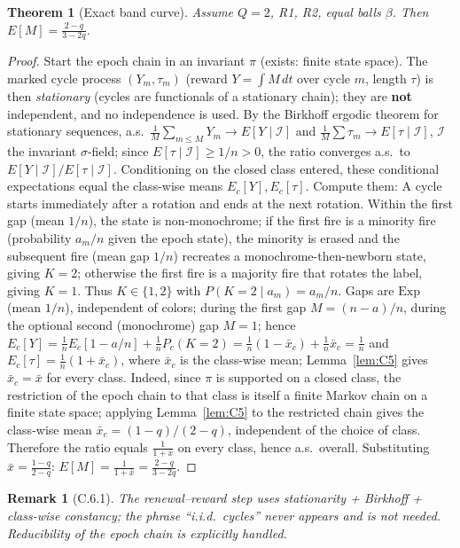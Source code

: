 \documentclass[preprint,12pt]{elsarticle}
\newtheorem{theorem}{Theorem}[section]
\newtheorem{remark}{Remark}[theorem]
\begin{document}
\begin{theorem}[Exact band curve]
\label{thm:C6}
Assume $Q=2$, R1, R2, equal balls $\beta$. Then
$E[M]=\frac{2-q}{3-2q}$.
\end{theorem}
\begin{proof}
Start the epoch chain in an invariant $\pi$ (exists: finite state space).
The marked cycle process $(Y_m,\tau_m)$ (reward $Y=\int M\,dt$ over cycle
$m$, length $\tau$) is then \emph{stationary} (cycles are functionals of
a stationary chain); they are \textbf{not} independent, and no
independence is used. By the Birkhoff ergodic theorem for stationary
sequences, a.s.\ $\frac1M\sum_{m\le M}Y_m\to E[Y\mid\mathcal I]$ and
$\frac1M\sum\tau_m\to E[\tau\mid\mathcal I]$, $\mathcal I$ the invariant
$\sigma$-field; since $E[\tau\mid\mathcal I]\ge1/n>0$, the ratio
converges a.s.\ to $E[Y\mid\mathcal I]/E[\tau\mid\mathcal I]$.
Conditioning on the closed class entered, these conditional expectations
equal the class-wise means $E_c[Y],E_c[\tau]$. Compute them: A cycle starts immediately after a rotation and ends at the next
rotation. Within the first gap (mean $1/n$), the state is non-monochrome;
if the first fire is a minority fire (probability $a_m/n$ given the
epoch state), the minority is erased and the subsequent fire (mean gap
$1/n$) recreates a monochrome-then-newborn state, giving $K=2$;
otherwise the first fire is a majority fire that rotates the label,
giving $K=1$. Thus $K\in\{1,2\}$ with $P(K=2\mid a_m)=a_m/n$. Gaps are
$\mathrm{Exp}$ (mean $1/n$), independent of colors; during the first gap
$M=(n-a)/n$, during the optional second (monochrome) gap $M=1$; hence
$E_c[Y]=\frac1n E_c[1-a/n]+\frac1n P_c(K=2)
=\frac1n(1-\bar x_c)+\frac1n\bar x_c=\frac1n$ and
$E_c[\tau]=\frac1n(1+\bar x_c)$, where $\bar x_c$ is the class-wise
mean; Lemma~\ref{lem:C5} gives $\bar x_c=\bar x$ for every class.
Indeed, since $\pi$ is supported on a closed class, the restriction of
the epoch chain to that class is itself a finite Markov chain on a
finite state space; applying Lemma~\ref{lem:C5} to the restricted
chain gives the class-wise mean $\bar x_c=(1-q)/(2-q)$, independent of
the choice of class.
Therefore the ratio equals $\frac{1}{1+\bar x}$ on every class, hence
a.s.\ overall. Substituting $\bar x=\frac{1-q}{2-q}$:
$E[M]=\frac{1}{1+\bar x}=\frac{2-q}{3-2q}$.
\end{proof}
\begin{remark}[C.6.1]
\label{rem:C6.1}
The renewal--reward step uses stationarity + Birkhoff + class-wise
constancy; the phrase ``i.i.d.\ cycles'' never appears and is not
needed. Reducibility of the epoch chain is explicitly handled.
\end{remark}
\end{document}

